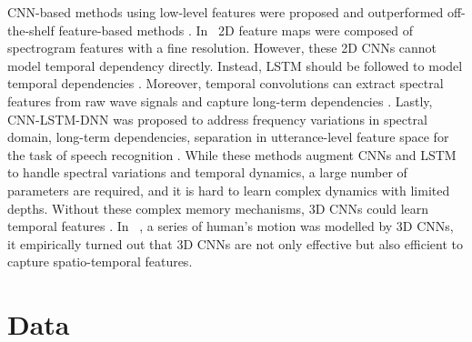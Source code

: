 \documentclass[conference, compsoc, twoside]{IEEEtran}
\begin{document}
CNN-based methods using low-level features were proposed and outperformed off-the-shelf feature-based methods \cite{zheng2015experimental,mao2014learning,anandconvoluted,trigeorgis2016adieu,kim2017acmmm}. In~\cite{zheng2015experimental,mao2014learning,anandconvoluted} 2D feature maps were composed of spectrogram features with a fine resolution. However, these 2D CNNs cannot model temporal dependency directly. Instead, LSTM should be followed to model temporal dependencies \cite{anandconvoluted,trigeorgis2016adieu}. Moreover, temporal convolutions can extract spectral features from raw wave signals and capture long-term dependencies \cite{trigeorgis2016adieu}. Lastly, CNN-LSTM-DNN was proposed to address frequency variations in spectral domain, long-term dependencies, separation in utterance-level feature space for the task of speech recognition \cite{sainath2015convolutional}. While these methods augment CNNs and LSTM to handle spectral variations and temporal dynamics, a large number of parameters are required, and it is hard to learn complex dynamics with limited depths. Without these complex memory mechanisms, 3D CNNs could learn temporal features \cite{ji20133d,tran2015learning}. In ~\cite{ji20133d,tran2015learning}, a series of human's motion was modelled by 3D CNNs, it empirically turned out that 3D CNNs are not only effective but also efficient to capture spatio-temporal features.

\section{Data}\label{sec:data}
\end{document}
